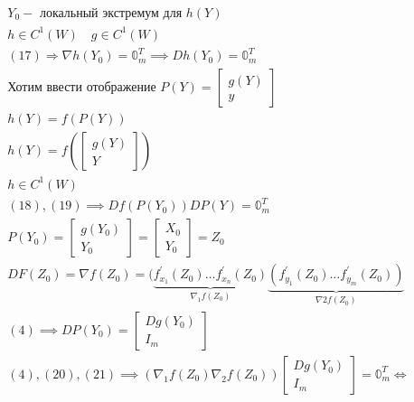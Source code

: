\documentclass[main]{subfiles}
\begin{document}
\begin{longProof}
\begin{gather*}
             Y_0 - \text { локальный экстремум для } h(Y) \tag{17}\\
             h \in C^1(W) \quad g \in C^1(W) \\
            (17) \Rightarrow \nabla h(Y_0) = \mathbb{0}^T_m  \implies
            Dh(Y_0) = \mathbb{0}^T_m \tag{18} \\
            \text{Хотим ввести отображение } P(Y) = \begin{bmatrix*}
                g(Y) \\
                y
            \end{bmatrix*} \\
             h(Y) = f(P(Y)) \tag{19} \\
             h(Y) = f \left( \begin{bmatrix*}
                g(Y) \\
                Y
             \end{bmatrix*} \right) \\
             h \in C^1(W) \\
             (18), (19) \implies Df(P(Y_0))DP(Y) = \mathbb{0}^T_m \tag{4} \\
             P(Y_0) = \begin{bmatrix*}
                g(Y_0) \\
                Y_0
             \end{bmatrix*} = \begin{bmatrix*}
                X_0 \\
                Y_0 
             \end{bmatrix*} = Z_0 \\
             DF(Z_0) = \nabla f(Z_0) = (\underbrace{f^\prime_{x_1}(Z_0) \ldots f^\prime_{x_n}(Z_0)}_{\nabla_1 f(Z_0)} \underbrace{(f^\prime_{y_1}(Z_0) \ldots f^\prime_{y_m}(Z_0))}_{\nabla 2 f(Z_0)} \tag{21} \\
             (4) \implies DP(Y_0)  = \begin{bmatrix*}
                Dg(Y_0) \\
                I_m
             \end{bmatrix*} \tag{4\prime} \\
             (4), (20), (21) \implies (\nabla_1 f(Z_0) \nabla_2 f(Z_0)) \begin{bmatrix*}
                Dg(Y_0) \\
                I_m
             \end{bmatrix*} = \mathbb{0}^T_m \Leftrightarrow \\

\end{gather*}
\end{longProof}
\end{document}

